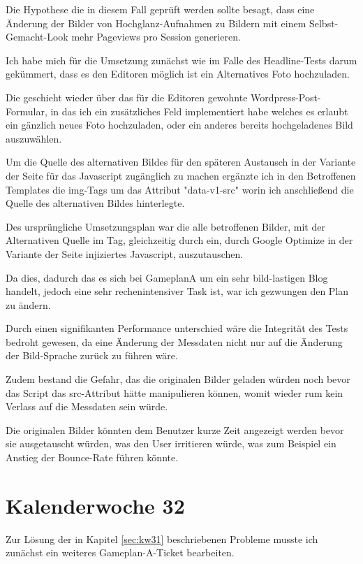 \documentclass[11pt]{article} %
\begin{document}
Die Hypothese die in diesem Fall geprüft werden sollte besagt, dass eine Änderung der Bilder von Hochglanz-Aufnahmen zu Bildern mit einem Selbst-Gemacht-Look mehr Pageviews pro Session generieren.

Ich habe mich für die Umsetzung zunächst wie im Falle des Headline-Tests darum gekümmert, dass es den Editoren möglich ist ein Alternatives Foto hochzuladen.

Die geschieht wieder über das für die Editoren gewohnte Wordpress-Post-Formular, in das ich ein zusätzliches Feld implementiert habe welches es erlaubt ein gänzlich neues Foto hochzuladen, oder ein anderes bereits hochgeladenes Bild auszuwählen.

Um die Quelle des alternativen Bildes für den späteren Austausch in der Variante der Seite für das Javascript zugänglich zu machen ergänzte ich in den Betroffenen Templates die img-Tags um das Attribut "data-v1-src" worin ich anschließend die Quelle des alternativen Bildes hinterlegte.

Des ursprüngliche Umsetzungsplan war die alle betroffenen Bilder, mit der Alternativen Quelle im Tag, gleichzeitig durch ein, durch Google Optimize in der Variante der Seite injiziertes Javascript,  auszutauschen.

Da dies, dadurch das es sich bei GameplanA um ein sehr bild-lastigen Blog handelt, jedoch eine sehr rechenintensiver Task ist, war ich gezwungen den Plan zu ändern.

Durch einen signifikanten Performance unterschied wäre die Integrität des Tests bedroht gewesen, da eine Änderung der Messdaten nicht nur auf die Änderung der Bild-Sprache zurück zu führen wäre.

Zudem bestand die Gefahr, das die originalen Bilder geladen würden noch bevor das Script das src-Attribut hätte manipulieren können, womit wieder rum kein Verlass auf die Messdaten sein würde.

Die originalen Bilder könnten dem Benutzer kurze Zeit angezeigt werden bevor sie ausgetauscht würden, was den User irritieren würde, was zum Beispiel ein Anstieg der Bounce-Rate führen könnte.

\section{Kalenderwoche 32} \label{sec:kw32}

Zur Lösung der in Kapitel \ref{sec:kw31} beschriebenen Probleme musste ich zunächst ein weiteres Gameplan-A-Ticket bearbeiten.
\end{document}
